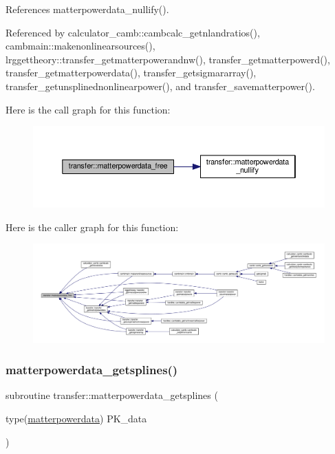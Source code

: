 References matterpowerdata\+\_\+nullify().



Referenced by calculator\+\_\+camb\+::cambcalc\+\_\+getnlandratios(), cambmain\+::makenonlinearsources(), lrggettheory\+::transfer\+\_\+getmatterpowerandnw(), transfer\+\_\+getmatterpowerd(), transfer\+\_\+getmatterpowerdata(), transfer\+\_\+getsigmararray(), transfer\+\_\+getunsplinednonlinearpower(), and transfer\+\_\+savematterpower().

Here is the call graph for this function\+:
\nopagebreak
\begin{figure}[H]
\begin{center}
\leavevmode
\includegraphics[width=350pt]{namespacetransfer_aca3eef4bfa07144ae4db1ec793e42c70_cgraph}
\end{center}
\end{figure}
Here is the caller graph for this function\+:
\nopagebreak
\begin{figure}[H]
\begin{center}
\leavevmode
\includegraphics[width=350pt]{namespacetransfer_aca3eef4bfa07144ae4db1ec793e42c70_icgraph}
\end{center}
\end{figure}
\mbox{\label{namespacetransfer_ad195947cd911f4aef6edba0319f4ac2f}} 
\subsubsection{\texorpdfstring{matterpowerdata\+\_\+getsplines()}{matterpowerdata\_getsplines()}}
{\footnotesize\ttfamily subroutine transfer\+::matterpowerdata\+\_\+getsplines (\begin{DoxyParamCaption}\item[{type(\mbox{\hyperlink{structtransfer_1_1matterpowerdata}{matterpowerdata}})}]{P\+K\+\_\+data }\end{DoxyParamCaption})}



